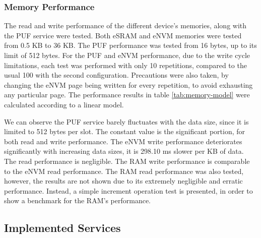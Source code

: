 \subsubsection{Memory Performance}\label{chap:evaluation:services:memory}

The read and write performance of the different device's memories, along with the PUF service were tested. Both eSRAM and eNVM memories were tested from 0.5 KB to 36 KB. The PUF performance was tested from 16 bytes, up to its limit of 512 bytes. For the PUF and eNVM performance, due to the write cycle limitations, each test was performed with only 10 repetitions, compared to the usual 100 with the second configuration. Precautions were also taken, by changing the eNVM page being written for every repetition, to avoid exhausting any particular page.
The performance results in table \ref{tab:memory-model} were calculated according to a linear model.



We can observe the PUF service barely fluctuates with the data size, since it is limited to 512 bytes per slot. The constant value is the significant portion, for both read and write performance.
The eNVM write performance deteriorates significantly with increasing data sizes, it is 298.10 ms slower per KB of data. The read performance is negligible.
The RAM write performance is comparable to the eNVM read performance. The RAM read performance was also tested, however, the results are not shown due to its extremely negligible and erratic performance. Instead, a simple increment operation test is presented, in order to show a benchmark for the RAM's performance.

\subsection{Implemented Services}\label{chap:evaluation:services}

